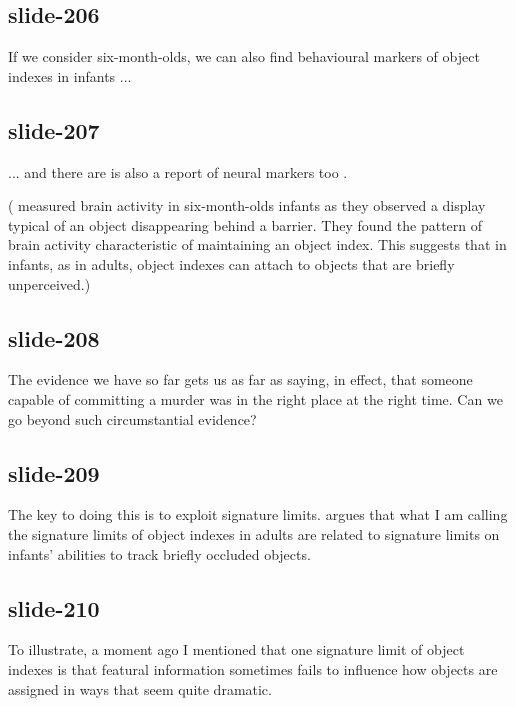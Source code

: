 \documentclass[12pt,\papersize]{extarticle}
\begin{document}
\subsection{slide-206}
If we consider six-month-olds, we can also find behavioural markers
of object indexes in infants \citep{richardson:2004_multimodal} ...

\subsection{slide-207}
... and there are is also a report of neural markers too \citep{kaufman:2005_oscillatory}.

(\citet{kaufman:2005_oscillatory} measured brain activity in
six-month-olds infants as they observed a display typical of an object
disappearing behind a barrier.
They found the pattern of brain activity characteristic of maintaining
an object index.
This suggests that in infants, as in adults, object indexes can attach
to objects that are briefly unperceived.)

\subsection{slide-208}
The evidence we have so far gets us as far as saying, in effect, that someone capable of committing a murder was in the right place at the right time.
Can we go beyond such circumstantial evidence?

\subsection{slide-209}
The key to doing this is to exploit signature limits.
\citet{carey:2009_origin} argues that what I am calling the signature
limits of object indexes in adults are related to signature limits on
infants’ abilities to track briefly occluded objects.

\subsection{slide-210}
To illustrate, a moment ago I mentioned that one signature limit of
object indexes is that featural information sometimes fails to influence how objects are assigned in ways that seem quite dramatic.
\end{document}
